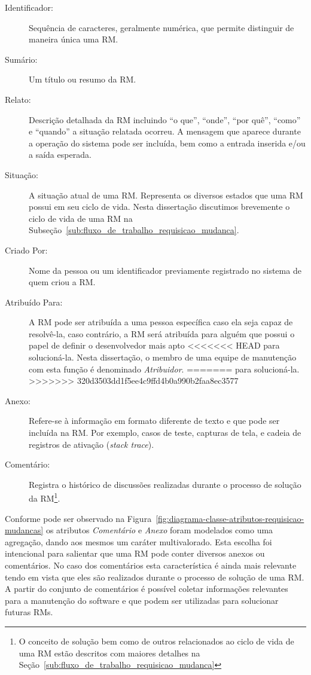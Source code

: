 \begin{description}
    \item [Identificador:] Sequência de caracteres, geralmente numérica,  que
        permite distinguir de maneira única uma RM\@.
	\item [Sumário:] Um título ou resumo da RM\@.
    \item [Relato:] Descrição detalhada da RM incluindo ``o que'', ``onde'',
        ``por quê'', ``como'' e ``quando'' a situação relatada ocorreu. A
        mensagem que aparece durante a operação do sistema pode ser incluída,
        bem como a entrada inserida e/ou a saída esperada.
	\item [Situação:] A situação atual de uma RM\@. Representa os diversos
		estados que uma RM possui em seu ciclo de vida. Nesta dissertação
		discutimos brevemente o ciclo de vida de uma RM na
		Subseção~\ref{sub:fluxo_de_trabalho_requisicao_mudanca}.
    \item [Criado Por:] Nome da pessoa ou um identificador previamente registrado
        no sistema de quem criou a RM\@.
    \item [Atribuído Para:] A RM pode ser atribuída a uma pessoa específica
        caso ela seja capaz de resolvê-la, caso contrário, a RM será atribuída
        para alguém que possui o papel de definir o desenvolvedor mais apto
<<<<<<< HEAD
        para solucioná-la. Nesta dissertação, o membro de uma equipe de
        manutenção com esta função é denominado \textit{Atribuidor}.
=======
        para solucioná-la.
>>>>>>> 320d3503dd1f5ee4c9ffd4b0a990b2faa8ec3577
    \item [Anexo:] Refere-se à informação em formato diferente de texto e que
        pode ser incluída na RM\@. Por exemplo, casos de teste, capturas de
        tela, e cadeia de registros de ativação (\textit{stack trace}).
    \item [Comentário:] Registra o histórico de discussões realizadas durante o
        processo de solução da RM\@\footnote{O conceito de solução bem como de
            outros relacionados ao ciclo de vida de uma RM estão descritos com
            maiores detalhes na
            Seção~\ref{sub:fluxo_de_trabalho_requisicao_mudanca}}.
\end{description}

Conforme pode ser observado na
Figura~\ref{fig:diagrama-classe-atributos-requisicao-mudancas} os atributos
\textit{Comentário} e \textit{Anexo} foram modelados como uma agregação, dando
aos mesmos um caráter multivalorado. Esta escolha foi intencional para salientar
que uma RM pode conter diversos anexos ou comentários. No caso dos comentários
esta característica é ainda mais relevante tendo em vista que eles são
realizados durante o processo de solução de uma RM\@. A partir do conjunto de
comentários é possível coletar informações relevantes para a manutenção do
software e que podem ser utilizadas para solucionar futuras RMs.

